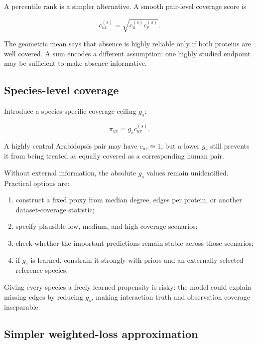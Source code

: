 \documentclass[11pt,a4paper]{article}
\begin{document}
A percentile rank is a simpler alternative. A smooth pair-level coverage score
is

\begin{equation}
  c_{uv}^{(s)} = \sqrt{c_u^{(s)}c_v^{(s)}}.
\end{equation}

The geometric mean says that absence is highly reliable only if both proteins
are well covered. A sum encodes a different assumption: one highly studied
endpoint may be sufficient to make absence informative.

\subsection{Species-level coverage}

Introduce a species-specific coverage ceiling $g_s$:

\begin{equation}
  \pi_{uv}=g_s c_{uv}^{(s)}.
\end{equation}

A highly central Arabidopsis pair may have $c_{uv}\simeq1$, but a lower $g_s$
still prevents it from being treated as equally covered as a corresponding
human pair.

Without external information, the absolute $g_s$ values remain unidentified.
Practical options are:

\begin{enumerate}
  \item construct a fixed proxy from median degree, edges per protein, or
        another dataset-coverage statistic;
  \item specify plausible low, medium, and high coverage scenarios;
  \item check whether the important predictions remain stable across those
        scenarios;
  \item if $g_s$ is learned, constrain it strongly with priors and an externally
        selected reference species.
\end{enumerate}

Giving every species a freely learned propensity is risky: the model could
explain missing edges by reducing $g_s$, making interaction truth and observation
coverage inseparable.

\subsection{Simpler weighted-loss approximation}
\end{document}
